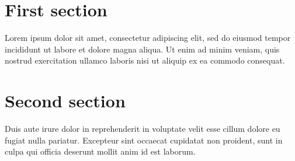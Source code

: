 \documentclass{article}
\begin{document}
    \section{First section}
    Lorem ipsum dolor sit amet, consectetur adipiscing elit, sed do eiusmod tempor incididunt ut labore et dolore magna aliqua. Ut enim ad minim veniam, quis nostrud exercitation ullamco laboris nisi ut aliquip ex ea commodo consequat\cite{PendegrassCatherineJane2012Teoa}.
    \section{Second section}
    Duis aute irure dolor in reprehenderit in voluptate velit esse cillum dolore eu fugiat nulla pariatur\cite{Chimutengwende-GordonM2017Tive}. Excepteur sint occaecat cupidatat non proident, sunt in culpa qui officia deserunt mollit anim id est laborum. 
    
\end{document}
